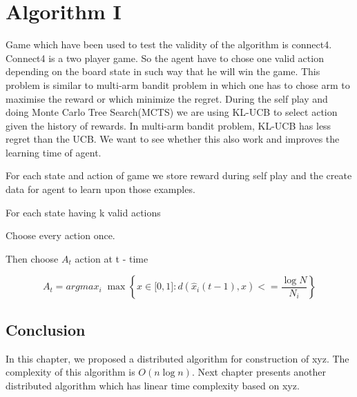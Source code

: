 \chapter{Algorithm I}
Game which have been used to test the validity of the algorithm is connect4. Connect4 is a two player game. 
So the agent have to chose one valid action depending on the board state in such way that he will win the game. This problem is similar to multi-arm bandit problem in which one has to chose arm to maximise the reward or which minimize the regret. During the self play and doing Monte Carlo Tree Search(MCTS) we are using KL-UCB to select action given the history of rewards. In multi-arm bandit problem, KL-UCB has less regret than the UCB. We want to see whether this also work and improves the learning time of agent.

For each state and action of game we store reward during self play and the create data for agent to learn upon those examples.
 \begin{steps}
  \item For each state having k valid actions
  \item Choose every action once.
  \item Then choose $A_{t}$ action at t - time
	   
$$ A_{t} = argmax_{i}\; \max \left \lbrace x  \in \lbrack 0,1 \rbrack  : d(\hat{x}_{i}(t-1), x) <=  \dfrac{\log N}{N_{i}} \right \rbrace  $$



\end{steps}



 

	

\section{Conclusion}
In this chapter, we proposed a distributed algorithm
for construction of xyz.
The complexity of this algorithm is $O(n \log n)$.
Next chapter presents
another distributed algorithm which has linear time 
complexity based on xyz.


